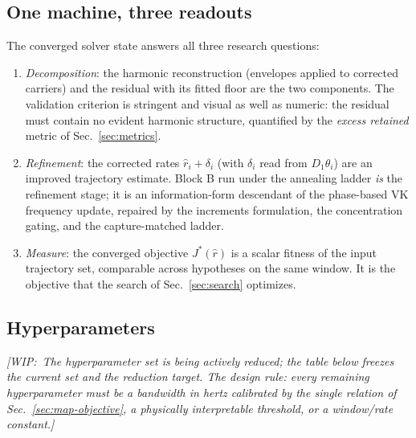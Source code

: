 \documentclass[journal]{IEEEtran}
\newcommand{\Jobj}{\ensuremath{J}}
\newcommand{\wip}[1]{{\color{gray!70!black}\textit{[WIP:~#1]}}}
\begin{document}
\subsection{One machine, three readouts}
\label{sec:readouts}

The converged solver state answers all three research questions:
\begin{enumerate}
\item \emph{Decomposition}: the harmonic reconstruction (envelopes
  applied to corrected carriers) and the residual with its fitted floor
  are the two components. The validation criterion is stringent and
  visual as well as numeric: the residual must contain no evident
  harmonic structure, quantified by the \emph{excess retained} metric of
  Sec.~\ref{sec:metrics}.
\item \emph{Refinement}: the corrected rates
  $\hat r_i + \delta_i$ (with $\delta_i$ read from $D_1\theta_i$) are an
  improved trajectory estimate. Block B run under the annealing ladder
  \emph{is} the refinement stage; it is an information-form descendant
  of the phase-based VK frequency update, repaired by the increments
  formulation, the concentration gating, and the capture-matched
  ladder.
\item \emph{Measure}: the converged objective $\Jobj^\ast(\hat r)$ is a
  scalar fitness of the input trajectory set, comparable across
  hypotheses on the same window. It is the objective that the search of
  Sec.~\ref{sec:search} optimizes.
\end{enumerate}

\subsection{Hyperparameters}
\label{sec:constants}

\wip{The hyperparameter set is being actively reduced; the table below
freezes the current set and the reduction target. The design rule: every
remaining hyperparameter must be a bandwidth in hertz calibrated by the
single relation of Sec.~\ref{sec:map-objective}, a physically
interpretable threshold, or a window/rate constant.}
\end{document}

